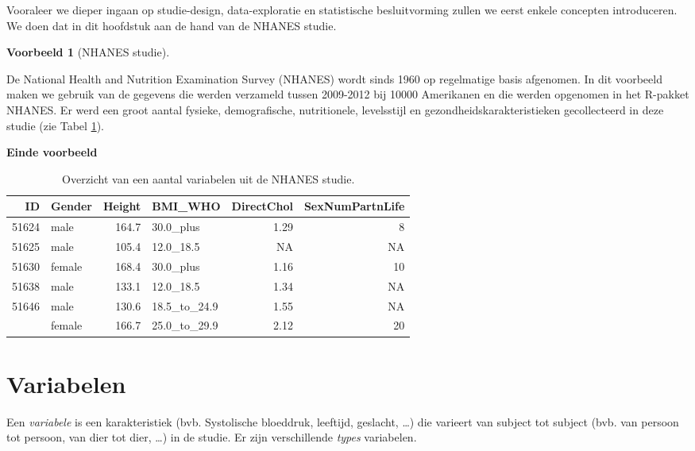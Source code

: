 \documentclass[
  12pt,dutch]{book}
\theoremstyle{definition}
\theoremstyle{definition}
\newtheorem{example}{Voorbeeld}[chapter]
\theoremstyle{definition}
\theoremstyle{definition}
\theoremstyle{remark}
\begin{document}
Vooraleer we dieper ingaan op studie-design, data-exploratie en statistische besluitvorming zullen we eerst enkele concepten introduceren.
We doen dat in dit hoofdstuk aan de hand van de NHANES studie.

\begin{example}[NHANES studie]
\protect\hypertarget{exm:nhanesExConcepten}{}\label{exm:nhanesExConcepten}~
\end{example}

De National Health and Nutrition Examination Survey
(NHANES) wordt sinds 1960 op regelmatige basis afgenomen. In dit voorbeeld maken we gebruik van de gegevens die werden verzameld tussen 2009-2012 bij 10000 Amerikanen en die werden opgenomen in het R-pakket NHANES. Er werd een groot aantal fysieke, demografische, nutritionele, levelsstijl en gezondheidskarakteristieken gecollecteerd in deze studie (zie Tabel \ref{tab:nhanesConcepten}).

\textbf{Einde voorbeeld}

\begin{table}

\caption{\label{tab:nhanesConcepten}Overzicht van een aantal variabelen uit de NHANES studie.}
\centering
\begin{tabular}[t]{rlrlrr}
\toprule
ID & Gender & Height & BMI\_WHO & DirectChol & SexNumPartnLife\\
\midrule
51624 & male & 164.7 & 30.0\_plus & 1.29 & 8\\
51625 & male & 105.4 & 12.0\_18.5 & NA & NA\\
51630 & female & 168.4 & 30.0\_plus & 1.16 & 10\\
51638 & male & 133.1 & 12.0\_18.5 & 1.34 & NA\\
51646 & male & 130.6 & 18.5\_to\_24.9 & 1.55 & NA\\
\addlinespace
51647 & female & 166.7 & 25.0\_to\_29.9 & 2.12 & 20\\
\bottomrule
\end{tabular}
\end{table}

\section{Variabelen}\label{variabelen}

Een \emph{variabele} is een karakteristiek (bvb. Systolische bloeddruk, leeftijd, geslacht, \ldots)
die varieert van subject tot subject (bvb. van persoon tot persoon, van dier tot dier, \ldots) in de studie.
Er zijn verschillende \emph{types} variabelen.
\end{document}
